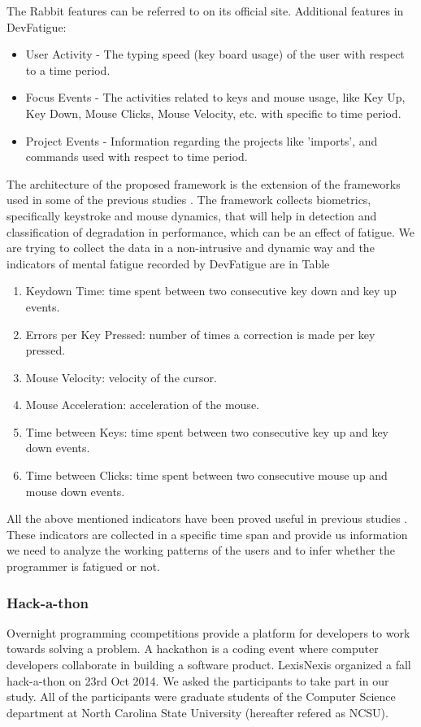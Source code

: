 \documentclass{acm_proc_article-sp}
\begin{document}
The Rabbit features can be referred to on its official
site\footnotemark[\ref{rabbitNote}].
Additional features in DevFatigue:
\begin{itemize}
	\item User Activity - The typing speed (key board usage) of the user with
	respect to a time period.
	\item Focus Events - The activities related to keys and mouse usage, like Key
	Up, Key Down, Mouse Clicks, Mouse Velocity, etc. with specific to time period.
	\item Project Events - Information regarding the projects like 'imports', and
	commands used with respect to time period.
\end{itemize}
The architecture of the proposed framework is the extension of the frameworks
used in some of the previous studies \cite{pimenta:analysis}. The framework
collects biometrics, specifically keystroke and mouse dynamics, that will
help in detection and classification of degradation in performance, which can
be an effect of fatigue. We are trying to collect the data in a non-intrusive
and dynamic way and the indicators of mental fatigue recorded by DevFatigue are
in Table 
  	\begin{enumerate}
   		\item Keydown Time: time spent between two consecutive key down and key up
   		events.
   		\item Errors per Key Pressed: number of times a correction is made per key
   		pressed.
   		\item Mouse Velocity: velocity of the cursor.
   		\item Mouse Acceleration: acceleration of the mouse.
   		\item Time between Keys: time spent between two consecutive key up and key
   		down events.
   		\item Time between Clicks: time spent between two consecutive mouse up and
   		mouse down events.
    \end{enumerate}
All the above mentioned indicators have been proved useful in previous studies
\cite{pimenta:monitor} \cite{pimenta:analysis}. These indicators are
collected in a specific time span and provide us information we need to analyze
the working patterns of the users and to infer whether the programmer is
fatigued or not.

\subsubsection{Hack-a-thon}
Overnight programming ccompetitions provide a platform for developers to work
towards solving a problem. A hackathon is a coding event where computer
developers collaborate in building a software product. LexisNexis organized a
fall hack-a-thon on 23rd Oct 2014. We asked the participants to take part in our
study. All of the participants were graduate students of the Computer Science
department at North Carolina State University (hereafter refered as NCSU).
\end{document}

